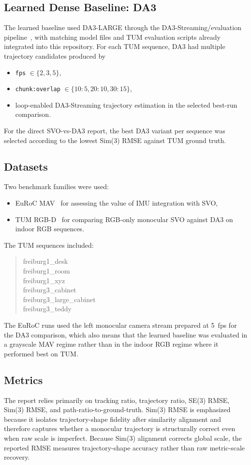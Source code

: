 \documentclass[conference]{IEEEtran}
\begin{document}
\subsection{Learned Dense Baseline: DA3}
The learned baseline used DA3-LARGE through the DA3-Streaming/evaluation pipeline~\cite{lin2025depthanything3}, with matching model files and TUM evaluation scripts already integrated into this repository. For each TUM sequence, DA3 had multiple trajectory candidates produced by
\begin{itemize}
\item \texttt{fps} $\in \{2,3,5\}$,
\item \texttt{chunk:overlap} $\in \{10{:}5,20{:}10,30{:}15\}$,
\item loop-enabled DA3-Streaming trajectory estimation in the selected best-run comparison.
\end{itemize}

For the direct SVO-vs-DA3 report, the best DA3 variant per sequence was selected according to the lowest Sim(3) RMSE against TUM ground truth.

\subsection{Datasets}
Two benchmark families were used:
\begin{itemize}
\item EuRoC MAV~\cite{burri2016euroc} for assessing the value of IMU integration with SVO,
\item TUM RGB-D~\cite{sturm2012tumrgbd} for comparing RGB-only monocular SVO against DA3 on indoor RGB sequences.
\end{itemize}

The TUM sequences included:
\begin{quote}
\ttfamily\small
freiburg1\_desk\\
freiburg1\_room\\
freiburg1\_xyz\\
freiburg3\_cabinet\\
freiburg3\_large\_cabinet\\
freiburg3\_teddy
\end{quote}
The EuRoC runs used the left monocular camera stream prepared at 5~fps for the DA3 comparison, which also means that the learned baseline was evaluated in a grayscale MAV regime rather than in the indoor RGB regime where it performed best on TUM.

\subsection{Metrics}
The report relies primarily on tracking ratio, trajectory ratio, SE(3) RMSE, Sim(3) RMSE, and path-ratio-to-ground-truth. Sim(3) RMSE is emphasized because it isolates trajectory-shape fidelity after similarity alignment and therefore captures whether a monocular trajectory is structurally correct even when raw scale is imperfect. Because Sim(3) alignment corrects global scale, the reported RMSE measures trajectory-shape accuracy rather than raw metric-scale recovery.
\end{document}
